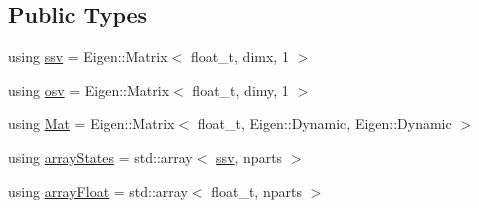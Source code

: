 \subsection*{Public Types}
\begin{DoxyCompactItemize}
\item 
using \hyperlink{classBSFilter_ad2341b982bcdabc798d7ed0f327d28f7}{ssv} = Eigen\+::\+Matrix$<$ float\+\_\+t, dimx, 1 $>$
\item 
using \hyperlink{classBSFilter_a9a4da560f11a6e2d35ffe693de54826b}{osv} = Eigen\+::\+Matrix$<$ float\+\_\+t, dimy, 1 $>$
\item 
using \hyperlink{classBSFilter_a190a71c131060b131c11ebe2c3fefbeb}{Mat} = Eigen\+::\+Matrix$<$ float\+\_\+t, Eigen\+::\+Dynamic, Eigen\+::\+Dynamic $>$
\item 
using \hyperlink{classBSFilter_a1d6f4a7ba66dda970cd6ea68a70fd641}{array\+States} = std\+::array$<$ \hyperlink{classBSFilter_ad2341b982bcdabc798d7ed0f327d28f7}{ssv}, nparts $>$
\item 
using \hyperlink{classBSFilter_af495dadc972ef1f8d776fe1716177aee}{array\+Float} = std\+::array$<$ float\+\_\+t, nparts $>$
\end{DoxyCompactItemize}
